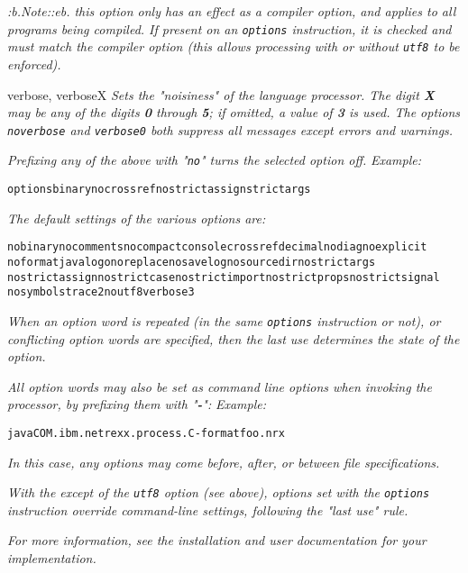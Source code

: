\begin{description}
\emph{:b.Note::eb.
this option only has an effect as a compiler option, and applies to
all programs being compiled.  If present on an \texttt{options}
instruction, it is checked and must match the compiler option (this
allows processing with or without \texttt{utf8} to be
enforced).}
\item{verbose, verboseX}
\emph{Sets the "noisiness" of the language processor.
The digit \textbf{\emph{X}} may be any of the digits \textbf{0}
through \textbf{5}; if omitted, a value of \textbf{3} is used.
The options \texttt{noverbose} and \texttt{verbose0} both suppress all
messages except errors and warnings.}
\end{description}
 
\emph{Prefixing any of the above with "\texttt{no}" turns the selected
option off.}
 \emph{Example:}
\begin{alltt}
options binary nocrossref nostrictassign strictargs
\end{alltt}
 
\emph{The default settings of the various options are:}
\begin{alltt}
nobinary nocomments nocompact console crossref decimal nodiag noexplicit
noformat java logo noreplace nosavelog nosourcedir nostrictargs
nostrictassign nostrictcase nostrictimport nostrictprops nostrictsignal
nosymbols trace2 noutf8 verbose3
\end{alltt}
 
\emph{When an option word is repeated (in the same \texttt{options}
instruction or not), or conflicting option words are specified, then the
last use determines the state of the option.}
 
\emph{All option words may also be set as command line options when invoking
the processor, by prefixing them with "\textbf{-}":}
 \emph{Example:}
\begin{alltt}
java COM.ibm.netrexx.process.\nr{}C -format foo.nrx
\end{alltt}
\emph{In this case, any options may come before, after, or between
file specifications.}
 
\emph{With the except of the \texttt{utf8} option (see above),
options set with the \texttt{options} instruction override command-line
settings, following the "last use" rule.}
 
\emph{For more information, see the installation and user documentation for
your implementation.
}
